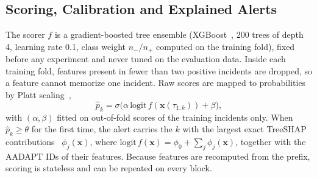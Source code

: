 \subsection{Scoring, Calibration and Explained Alerts}
\label{sec:scoring}
The scorer $f$ is a gradient-boosted tree ensemble (XGBoost~\cite{chen2016xgboost}, 200 trees of depth 4, learning rate 0.1, class weight $n_-/n_+$ computed on the training fold), fixed before any experiment and never tuned on the evaluation data.
Inside each training fold, features present in fewer than two positive incidents are dropped, so a feature cannot memorize one incident.
Raw scores are mapped to probabilities by Platt scaling~\cite{niculescu2005calibration},
\begin{equation}
\hat p_k=\sigma\!\bigl(\alpha\,\mathrm{logit}\,f(\mathbf{x}(\tau_{1:k}))+\beta\bigr),
\label{eq:platt}
\end{equation}
with $(\alpha,\beta)$ fitted on out-of-fold scores of the training incidents only.
When $\hat p_k\ge\theta$ for the first time, the alert carries the $k$ with the largest exact TreeSHAP contributions~\cite{lundberg2020treeshap} $\phi_j(\mathbf{x})$, where $\mathrm{logit}\,f(\mathbf{x})=\phi_0+\sum_j\phi_j(\mathbf{x})$, together with the AADAPT IDs of their features.
Because features are recomputed from the prefix, scoring is stateless and can be repeated on every block.
